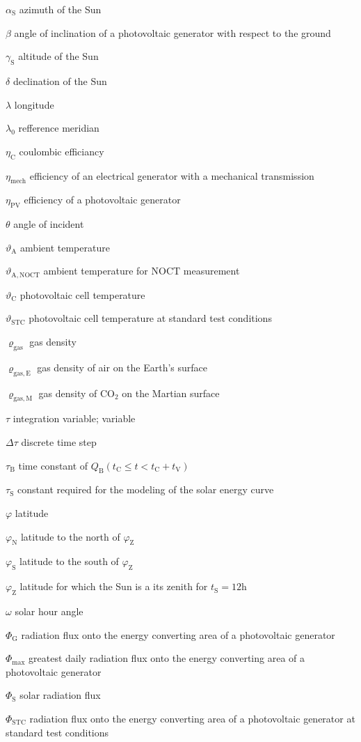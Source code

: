\begin{symb}
\item[$\alpha_\mathrm{S}$]				azimuth of the Sun
\item[$\beta$]							angle of inclination of a photovoltaic generator with respect to the ground
\item[$\gamma_\mathrm{S}$]				altitude of the Sun
\item[$\delta$]							declination of the Sun
\item[$\lambda$]						longitude
\item[$\lambda_0$]						refference meridian
\item[$\eta_\mathrm{C}$]				coulombic efficiancy
\item[$\eta_\mathrm{mech}$]				efficiency of an electrical generator with a mechanical transmission
\item[$\eta_\mathrm{PV}$]				efficiency of a photovoltaic generator
\item[$\theta$]							angle of incident
\item[$\vartheta_\mathrm{A}$]			ambient temperature
\item[$\vartheta_\mathrm{A,NOCT}$]		ambient temperature for $\mathrm{NOCT}$ measurement
\item[$\vartheta_\mathrm{C}$]			photovoltaic cell temperature
\item[$\vartheta_\mathrm{STC}$]			photovoltaic cell temperature at standard test conditions
\item[$\varrho_\mathrm{gas}$]			gas density
\item[$\varrho_\mathrm{gas,E}$]			gas density of air on the Earth's surface
\item[$\varrho_\mathrm{gas,M}$]			gas density of $\mathrm{CO}_2$ on the Martian surface
\item[$\tau$]							integration variable; variable
\item[$\Delta \tau$]					discrete time step 
\item[$\tau_\mathrm{B}$]				time constant of $Q_\mathrm{B}(t_\mathrm{C} \leq t < t_\mathrm{C} + t_\mathrm{V})$
\item[$\tau_\mathrm{S}$]				constant required for the modeling of the solar energy curve
\item[$\varphi$]						latitude
\item[$\varphi_\mathrm{N}$]				latitude to the north of $\varphi_\mathrm{Z}$
\item[$\varphi_\mathrm{S}$]				latitude to the south of $\varphi_\mathrm{Z}$
\item[$\varphi_\mathrm{Z}$]				latitude for which the Sun is a its zenith for $t_\mathrm{S} = 12\mathrm{h}$
\item[$\omega$]							solar hour angle
\item[$\Phi_\mathrm{G}$]				radiation flux onto the energy converting area of a photovoltaic generator
\item[$\Phi_\mathrm{max}$]				greatest daily radiation flux onto the energy converting area of a photovoltaic generator
\item[$\Phi_\mathrm{S}$]				solar radiation flux
\item[$\Phi_\mathrm{STC}$]				radiation flux onto the energy converting area of a photovoltaic generator at standard test conditions



\end{symb}

